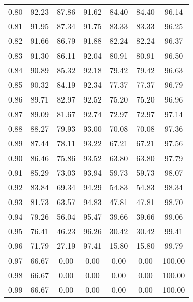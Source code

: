 \begin{tabular}{|c|c|c|c|c|c|c|}
      0.80 &     92.23 &     87.86 &      91.62 &   84.40 &      84.40 &         96.14 \\
      0.81 &     91.95 &     87.34 &      91.75 &   83.33 &      83.33 &         96.25 \\
      0.82 &     91.66 &     86.79 &      91.88 &   82.24 &      82.24 &         96.37 \\
      0.83 &     91.30 &     86.11 &      92.04 &   80.91 &      80.91 &         96.50 \\
      0.84 &     90.89 &     85.32 &      92.18 &   79.42 &      79.42 &         96.63 \\
      0.85 &     90.32 &     84.19 &      92.34 &   77.37 &      77.37 &         96.79 \\
      0.86 &     89.71 &     82.97 &      92.52 &   75.20 &      75.20 &         96.96 \\
      0.87 &     89.09 &     81.67 &      92.74 &   72.97 &      72.97 &         97.14 \\
      0.88 &     88.27 &     79.93 &      93.00 &   70.08 &      70.08 &         97.36 \\
      0.89 &     87.44 &     78.11 &      93.22 &   67.21 &      67.21 &         97.56 \\
      0.90 &     86.46 &     75.86 &      93.52 &   63.80 &      63.80 &         97.79 \\
      0.91 &     85.29 &     73.03 &      93.94 &   59.73 &      59.73 &         98.07 \\
      0.92 &     83.84 &     69.34 &      94.29 &   54.83 &      54.83 &         98.34 \\
      0.93 &     81.73 &     63.57 &      94.83 &   47.81 &      47.81 &         98.70 \\
      0.94 &     79.26 &     56.04 &      95.47 &   39.66 &      39.66 &         99.06 \\
      0.95 &     76.41 &     46.23 &      96.26 &   30.42 &      30.42 &         99.41 \\
      0.96 &     71.79 &     27.19 &      97.41 &   15.80 &      15.80 &         99.79 \\
      0.97 &     66.67 &      0.00 &       0.00 &    0.00 &       0.00 &        100.00 \\
      0.98 &     66.67 &      0.00 &       0.00 &    0.00 &       0.00 &        100.00 \\
      0.99 &     66.67 &      0.00 &       0.00 &    0.00 &       0.00 &        100.00 \\
\bottomrule
\end{tabular}
